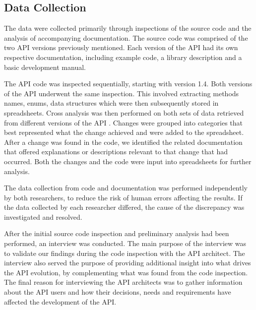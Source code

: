\documentclass{sig-alternate}
\begin{document}
\subsection{Data Collection} \label{data_collection}
The data were collected primarily through inspections of the source code and the analysis of accompanying documentation. The source code was comprised of the two API versions previously mentioned. Each version of the API had its own respective documentation, including example code, a library description and a basic development manual. 

The API code was inspected sequentially, starting with version 1.4. Both versions of the API underwent the same inspection. This involved extracting methods names, enums, data structures which were then subsequently stored in spreadsheets. Cross analysis was then performed on both sets of data retrieved from different versions of the API \cite{seaman1999qualitative}. Changes were grouped into categories that best represented what the change achieved and were added to the spreadsheet. After a change was found in the code, we identified the related documentation that offered explanations or descriptions relevant to that change that had occurred. Both the changes and the code were input into spreadsheets for further analysis. 


The data collection from code and documentation was performed independently by both researchers, to reduce the risk of human errors affecting the results. If the data collected by each researcher differed, the cause of the discrepancy was investigated and resolved. 

After the initial source code inspection and preliminary analysis had been performed, an interview was conducted. The main purpose of the interview was to validate our findings during the code inspection with the API architect. The interview also served the purpose of providing additional insight into what drives the API evolution, by complementing what was found from the code inspection. The final reason for interviewing the API architects was to gather information about the API users and how their decisions, needs and requirements have affected the development of the API.
\end{document}
